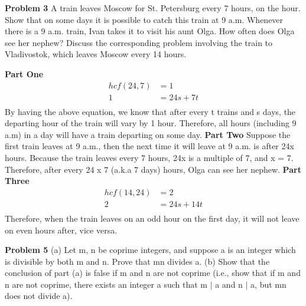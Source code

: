 \documentclass[12pt,letterpaper]{hmcpset}
\begin{document}
\begin{problem}
\textbf{Problem 3} A train leaves Moscow for St. Petersburg every 7 hours, on the hour.
Show that on some days it is possible to catch this train at 9 a.m.\newline
Whenever there is a 9 a.m. train, Ivan takes it to visit his aunt Olga. How often does Olga see her nephew? \newline
Discuss the corresponding problem involving the train to Vladivostok, which leaves Moscow every 14 hours.
\end{problem}

\begin{solution}
\textbf{Part One}
\begin{align*}
hcf(24, 7) &= 1 \\
1 &= 24s + 7t 	\\
\end{align*} 
By having the above equation, we know that after every t trains and s days, the departing hour of the train will vary by 1 hour. Therefore, all hours (including 9 a.m) in a day will have a train departing on some day.
\newline \newline \textbf{Part Two} Suppose the first train leaves at 9 a.m., then the next time it will leave at 9 a.m. is after 24x hours. Because the train leaves every 7 hours, 24x is a multiple of 7, and x = 7. Therefore, after every 24 x 7 (a.k.a 7 days) hours, Olga can see her nephew.
\newline \newline \textbf{Part Three} 
\begin{align*}
hcf(14, 24) &= 2	\\
2	&= 24s + 14t	\\
\end{align*} 
Therefore, when the train leaves on an odd hour on the first day, it will not leave on even hours after, vice versa.
\end{solution}

\begin{problem}
\textbf{Problem 5} (a) Let m, n be coprime integers, and suppose a is an integer which is divisible by both m and n. Prove that mn divides a.
(b) Show that the conclusion of part (a) is false if m and n are not coprime (i.e., show that if m and n are not coprime, there exists an integer a such that m $\mid$ a and n $\mid$ a, but mn does not divide a).
\end{problem}
\end{document}
